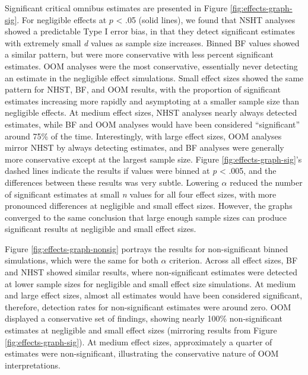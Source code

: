 \documentclass[english,man]{apa6}
\theoremstyle{definition}
\theoremstyle{definition}
\theoremstyle{definition}
\theoremstyle{remark}
\begin{document}
Significant critical omnibus estimates are presented in Figure
\ref{fig:effects-graph-sig}. For negligible effects at \(p\) \textless{}
.05 (solid lines), we found that NSHT analyses showed a predictable Type
I error bias, in that they detect significant estimates with extremely
small \emph{d} values as sample size increases. Binned BF values showed
a similar pattern, but were more conservative with less percent
significant estimates. OOM analyses were the most conservative,
essentially never detecting an estimate in the negligible effect
simulations. Small effect sizes showed the same pattern for NHST, BF,
and OOM results, with the proportion of significant estimates increasing
more rapidly and asymptoting at a smaller sample size than negligible
effects. At medium effect sizes, NHST analyses nearly always detected
estimates, while BF and OOM analyses would have been considered
\enquote{significant} around 75\% of the time. Interestingly, with large
effect sizes, OOM analyses mirror NHST by always detecting estimates,
and BF analyses were generally more conservative except at the largest
sample size. Figure \ref{fig:effects-graph-sig}'s dashed lines indicate
the results if values were binned at \emph{p} \textless{} .005, and the
differences between these results was very subtle. Lowering \(\alpha\)
reduced the number of significant estimates at small \emph{n} values for
all four effect sizes, with more pronounced differences at negligible
and small effect sizes. However, the graphs converged to the same
conclusion that large enough sample sizes can produce significant
results at negligible and small effect sizes.

Figure \ref{fig:effects-graph-nonsig} portrays the results for
non-significant binned simulations, which were the same for both
\(\alpha\) criterion. Across all effect sizes, BF and NHST showed
similar results, where non-significant estimates were detected at lower
sample sizes for negligible and small effect size simulations. At medium
and large effect sizes, almost all estimates would have been considered
significant, therefore, detection rates for non-significant estimates
were around zero. OOM displayed a conservative set of findings, showing
nearly 100\% non-significant estimates at negligible and small effect
sizes (mirroring results from Figure \ref{fig:effects-graph-sig}). At
medium effect sizes, approximately a quarter of estimates were
non-significant, illustrating the conservative nature of OOM
interpretations.
\end{document}
